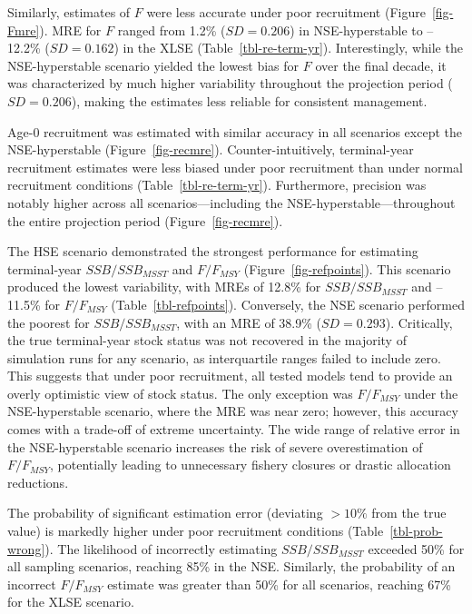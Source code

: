 \documentclass[
  letterpaper,
  12pt,
  letterpaper]{report}
\begin{document}
Similarly, estimates of \(F\) were less accurate under poor recruitment
(Figure~\ref{fig-Fmre}). MRE for \(F\) ranged from 1.2\%
(\(SD = 0.206\)) in NSE-hyperstable to --12.2\% (\(SD = 0.162\)) in the
XLSE (Table~\ref{tbl-re-term-yr}). Interestingly, while the
NSE-hyperstable scenario yielded the lowest bias for \(F\) over the
final decade, it was characterized by much higher variability throughout
the projection period (\(SD = 0.206\)), making the estimates less
reliable for consistent management.

Age-0 recruitment was estimated with similar accuracy in all scenarios
except the NSE-hyperstable (Figure~\ref{fig-recmre}).
Counter-intuitively, terminal-year recruitment estimates were less
biased under poor recruitment than under normal recruitment conditions
(Table~\ref{tbl-re-term-yr}). Furthermore, precision was notably higher
across all scenarios---including the NSE-hyperstable---throughout the
entire projection period (Figure~\ref{fig-recmre}).

The HSE scenario demonstrated the strongest performance for estimating
terminal-year \(SSB/SSB_{MSST}\) and \(F/F_{MSY}\)
(Figure~\ref{fig-refpoints}). This scenario produced the lowest
variability, with MREs of 12.8\% for \(SSB/SSB_{MSST}\) and --11.5\% for
\(F/F_{MSY}\) (Table~\ref{tbl-refpoints}). Conversely, the NSE scenario
performed the poorest for \(SSB/SSB_{MSST}\), with an MRE of 38.9\%
(\(SD = 0.293\)). Critically, the true terminal-year stock status was
not recovered in the majority of simulation runs for any scenario, as
interquartile ranges failed to include zero. This suggests that under
poor recruitment, all tested models tend to provide an overly optimistic
view of stock status. The only exception was \(F/F_{MSY}\) under the
NSE-hyperstable scenario, where the MRE was near zero; however, this
accuracy comes with a trade-off of extreme uncertainty. The wide range
of relative error in the NSE-hyperstable scenario increases the risk of
severe overestimation of \(F/F_{MSY}\), potentially leading to
unnecessary fishery closures or drastic allocation reductions.

The probability of significant estimation error (deviating \(>10\%\)
from the true value) is markedly higher under poor recruitment
conditions (Table~\ref{tbl-prob-wrong}). The likelihood of incorrectly
estimating \(SSB/SSB_{MSST}\) exceeded 50\% for all sampling scenarios,
reaching 85\% in the NSE. Similarly, the probability of an incorrect
\(F/F_{MSY}\) estimate was greater than 50\% for all scenarios, reaching
67\% for the XLSE scenario.
\end{document}
